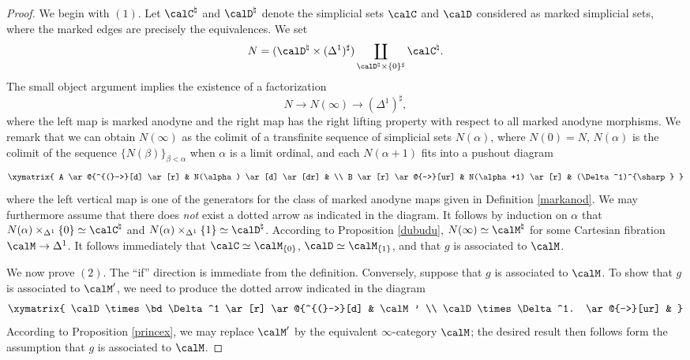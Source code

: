 \begin{proof}
We begin with $(1)$. Let $\calC^{\natural}$ and $\calD^{\natural}$ denote
the simplicial sets $\calC$ and $\calD$ considered as marked simplicial sets, where the marked edges are precisely the equivalences. We set
$$N = ( \calD^{\natural} \times (\Delta^{1})^{\sharp}) \coprod_{ \calD^{\natural} \times \{0\}^{\sharp} } \calC^{\natural}.$$ 
The small object argument implies the existence of a factorization
$$ N \rightarrow N(\infty) \rightarrow (\Delta^1)^{\sharp},$$
where the left map is marked anodyne and the right map has the right lifting property with respect to all marked anodyne morphisms. We remark
that we can obtain $N(\infty)$ as the colimit of a transfinite sequence of simplicial sets $N(\alpha)$, where $N(0) = N$, $N(\alpha)$ is the colimit of the sequence $\{ N(\beta) \}_{\beta < \alpha}$ when
$\alpha$ is a limit ordinal, and each $N(\alpha+1)$ fits into a pushout diagram
$$ \xymatrix{ A \ar@{^{(}->}[d] \ar[r] & N(\alpha) \ar[d] \ar[dr] &  \\
B \ar[r] \ar@{-->}[ur] & N(\alpha+1) \ar[r] & (\Delta^1)^{\sharp} }$$
where the left vertical map is one of the generators for the class of marked anodyne maps
given in Definition \ref{markanod}. We may furthermore assume that there does {\em not} exist a dotted arrow as indicated in the diagram. It follows by induction on $\alpha$ that
$N(\alpha) \times_{\Delta^1} \{0\} \simeq \calC^{\natural}$ and $N(\alpha) \times_{ \Delta^1} \{1\} \simeq \calD^{\natural}$. According to Proposition \ref{dubudu}, $N(\infty) \simeq \calM^{\natural}$ for
some Cartesian fibration $\calM \rightarrow \Delta^1$. It follows immediately that
$\calC \simeq \calM_{\{0\}}$, $\calD \simeq \calM_{\{1\}}$, and that $g$ is associated to $\calM$.

We now prove $(2)$. The ``if'' direction is immediate from the definition. Conversely, suppose that $g$ is associated to $\calM$. To show that $g$ is associated to $\calM'$, we need to produce the dotted arrow indicated in the diagram
$$ \xymatrix{ \calD \times \bd \Delta^1 \ar[r] \ar@{^{(}->}[d] & \calM' \\
\calD \times \Delta^1. \ar@{-->}[ur] & }$$
According to Proposition \ref{princex}, we may replace $\calM'$ by the equivalent $\infty$-category
$\calM$; the desired result then follows form the assumption that $g$ is associated to $\calM$.


\end{proof}
